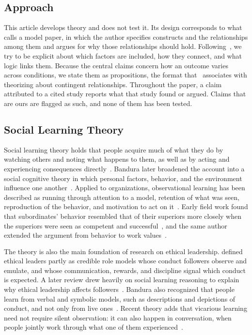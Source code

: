 \subsection{Approach}

This article develops theory and does not test it. Its design corresponds to what~\citet{jaakkola2020designing} calls a model paper, in which the author specifies constructs and the relationships among them and argues for why those relationships should hold. Following~\citet{whetten1989constitutes}, we try to be explicit about which factors are included, how they connect, and what logic links them. Because the central claims concern how an outcome varies across conditions, we state them as propositions, the format that~\citet{cornelissen2017developing} associates with theorizing about contingent relationships. Throughout the paper, a claim attributed to a cited study reports what that study found or argued. Claims that are ours are flagged as such, and none of them has been tested.

\subsection{Social Learning Theory}

Social learning theory holds that people acquire much of what they do by watching others and noting what happens to them, as well as by acting and experiencing consequences directly~\citep{bandura1977social}. Bandura later broadened the account into a social cognitive theory in which personal factors, behavior, and the environment influence one another~\citep{bandura1986social}. Applied to organizations, observational learning has been described as running through attention to a model, retention of what was seen, reproduction of the behavior, and motivation to act on it~\citep{manz1981vicarious}. Early field work found that subordinates' behavior resembled that of their superiors more closely when the superiors were seen as competent and successful~\citep{weiss1977subordinate}, and the same author extended the argument from behavior to work values~\citep{weiss1978social}.

The theory is also the main foundation of research on ethical leadership. \citet{brown2005ethical} defined ethical leaders partly as credible role models whose conduct followers observe and emulate, and whose communication, rewards, and discipline signal which conduct is expected. A later review drew heavily on social learning reasoning to explain why ethical leadership affects followers~\citep{brown2006ethical}. Bandura also recognized that people learn from verbal and symbolic models, such as descriptions and depictions of conduct, and not only from live ones~\citep{bandura1977social}. Recent theory adds that vicarious learning need not require silent observation: it can also happen in conversation, when people jointly work through what one of them experienced~\citep{myers2018coactive}.

